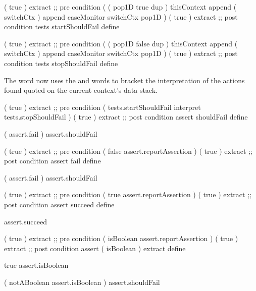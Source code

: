 \startJoylolCode
( { true } ) extract ;; pre condition
(
  (
    pop1D
    true
    dup
  ) 
  thisContext
  append
  ( switchCtx )
  append
  caseMonitor
  switchCtx
  pop1D
)
( { true } ) extract ;; post condition
tests
startShouldFail
define 
\stopJoylolCode 

\startJoylolCode
( { true } ) extract ;; pre condition
(
  (
    pop1D
    false
    dup
  )
  thisContext
  append
  ( switchCtx )
  append
  caseMonitor
  switchCtx
  pop1D
)
( { true } ) extract ;; post condition
tests
stopShouldFail
define
\stopJoylolCode

The  word now uses the 
 and  words to 
bracket the interpretation of the actions found quoted on the current 
context's data stack. 

\startJoylolCode
( { true } ) extract ;; pre condition
(
  tests.startShouldFail
  interpret
  tests.stopShouldFail
)
( { true } ) extract ;; post condition
assert
shouldFail
define
\stopJoylolCode

\startJoylolTest
( assert.fail ) assert.shouldFail
\stopJoylolTest
\stopTestCase
\stopTestSuite


\startJoylolCode
( { true } ) extract ;; pre condition
(
  false
  assert.reportAssertion
)
( { true } ) extract ;; post condition
assert
fail
define
\stopJoylolCode

\startJoylolTest
( assert.fail ) assert.shouldFail
\stopJoylolTest
\stopTestCase
\stopTestSuite

\startJoylolCode
( { true } ) extract ;; pre condition
(
  true
  assert.reportAssertion
)
( { true } ) extract ;; post condition
assert
succeed
define
\stopJoylolCode

\startJoylolTest
assert.succeed
\stopJoylolTest
\stopTestCase
\stopTestSuite

\startJoylolCode
( { true } ) extract ;; pre condition
(
  isBoolean
  assert.reportAssertion
)
( { true } ) extract ;; post condition
assert
( isBoolean ) extract
define
\stopJoylolCode

\startJoylolTest
true
assert.isBoolean
\stopJoylolTest
\stopTestCase

\startJoylolTest
(
  notABoolean
  assert.isBoolean
) assert.shouldFail
\stopJoylolTest
\stopTestCase
\stopTestSuite


